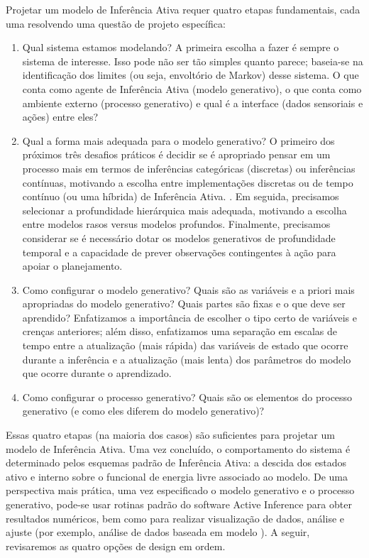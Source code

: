 \documentclass[
  12pt,
]{book}
\begin{document}
Projetar um modelo de Inferência Ativa requer quatro etapas fundamentais, cada uma resolvendo uma questão de projeto específica:

\begin{enumerate}
\def\labelenumi{\arabic{enumi}.}
\item
  Qual sistema estamos modelando? A primeira escolha a fazer é sempre o sistema de interesse. Isso pode não ser tão simples quanto parece; baseia-se na identificação dos limites (ou seja, envoltório de Markov) desse sistema. O que conta como agente de Inferência Ativa (modelo generativo), o que conta como ambiente externo (processo generativo) e qual é a interface (dados sensoriais e ações) entre eles?
\item
  Qual a forma mais adequada para o modelo generativo? O primeiro dos próximos três desafios práticos é decidir se é apropriado pensar em um processo mais em termos de inferências categóricas (discretas) ou inferências contínuas, motivando a escolha entre implementações discretas ou de tempo contínuo (ou uma híbrida) de Inferência Ativa. . Em seguida, precisamos selecionar a profundidade hierárquica mais adequada, motivando a escolha entre modelos rasos versus modelos profundos. Finalmente, precisamos considerar se é necessário dotar os modelos generativos de profundidade temporal e a capacidade de prever observações contingentes à ação para apoiar o planejamento.
\item
  Como configurar o modelo generativo? Quais são as variáveis e a priori mais apropriadas do modelo generativo? Quais partes são fixas e o que deve ser aprendido? Enfatizamos a importância de escolher o tipo certo de variáveis e crenças anteriores; além disso, enfatizamos uma separação em escalas de tempo entre a atualização (mais rápida) das variáveis de estado que ocorre durante a inferência e a atualização (mais lenta) dos parâmetros do modelo que ocorre durante o aprendizado.
\item
  Como configurar o processo generativo? Quais são os elementos do processo generativo (e como eles diferem do modelo generativo)?
\end{enumerate}

Essas quatro etapas (na maioria dos casos) são suficientes para projetar um modelo de Inferência Ativa. Uma vez concluído, o comportamento do sistema é determinado pelos esquemas padrão de Inferência Ativa: a descida dos estados ativo e interno sobre o funcional de energia livre associado ao modelo. De uma perspectiva mais prática, uma vez especificado o modelo generativo e o processo generativo, pode-se usar rotinas padrão do software Active Inference para obter resultados numéricos, bem como para realizar visualização de dados, análise e ajuste (por exemplo, análise de dados baseada em modelo ). A seguir, revisaremos as quatro opções de design em ordem.
\end{document}
